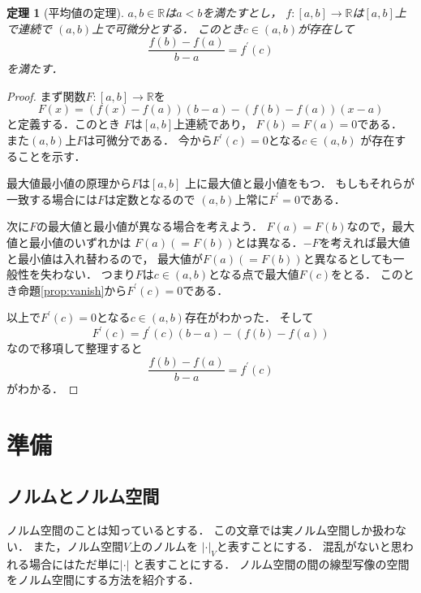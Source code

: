 \documentclass[leqno, a4paper, 12pt]{jsarticle}
\newtheorem{thm}{定理}
\newcommand{\rr}{\mathbb{R}}
\newcommand{\bibun}[1]{#1^{\prime}}
\begin{document}
\begin{thm}[平均値の定理]
$a, b\in \rr$は$a<b$を満たすとし，
$f: [a, b]\to \rr$は$[a, b]$上で連続で
$(a, b)$上で可微分とする．
このとき$c\in (a, b)$が存在して
\[
\frac{f(b)-f(a)}{b-a}=\bibun{f}(c)
\]
を満たす．
\end{thm}
\begin{proof}
まず関数$F: [a, b]\to \rr$を
\[
F(x)=(f(x)-f(a))(b-a)-(f(b)-f(a))(x-a)
\]
と定義する．このとき
$F$は$[a, b]$上連続であり，
$F(b)=F(a)=0$である．
また$(a, b)$上$F$は可微分である．
今から$\bibun{F}(c)=0$となる$c\in (a, b)$
が存在することを示す．

最大値最小値の原理から$F$は$[a, b]$
上に最大値と最小値をもつ．
もしもそれらが一致する場合には$F$は定数となるので
$(a, b)$上常に$\bibun{F}=0$である．

次に$F$の最大値と最小値が異なる場合を考えよう．
$F(a)=F(b)$なので，最大値と最小値のいずれかは
$F(a)(=F(b))$とは異なる．$-F$を考えれば最大値と最小値は入れ替わるので，
最大値が$F(a)(=F(b))$と異なるとしても一般性を失わない．
つまり$F$は$c\in (a, b)$となる点で最大値$F(c)$をとる．
このとき命題\ref{prop:vanish}から$\bibun{F}(c)=0$である．

以上で$\bibun{F}(c)=0$となる$c\in (a, b)$存在がわかった．
そして
\[
\bibun{F}(c)
=\bibun{f}(c)(b-a)-(f(b)-f(a))
\]
なので移項して整理すると
\[
\frac{f(b)-f(a)}{b-a}=\bibun{f}(c)
\]
がわかる．
\end{proof}


\section{準備}

\subsection{ノルムとノルム空間}

ノルム空間のことは知っているとする．
この文章では実ノルム空間しか扱わない．
また，ノルム空間$V$上のノルムを
$|\cdot|_{V}$と表すことにする．
混乱がないと思われる場合にはただ単に$|\cdot|$
と表すことにする．
ノルム空間の間の線型写像の空間をノルム空間にする方法を紹介する．
\end{document}
